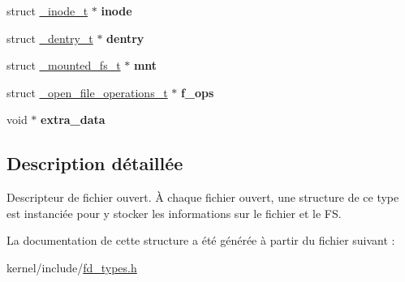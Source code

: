 \begin{DoxyCompactItemize}
\item 
\hypertarget{struct__open__file__descriptor_a6884ddeaeb43e81a0317cb5eae4c7d4e}{struct \hyperlink{struct__inode__t}{\-\_\-inode\-\_\-t} $\ast$ {\bfseries inode}}\label{struct__open__file__descriptor_a6884ddeaeb43e81a0317cb5eae4c7d4e}

\item 
\hypertarget{struct__open__file__descriptor_a3b375ad15f7bcb8e92123bd1a17765f3}{struct \hyperlink{struct__dentry__t}{\-\_\-dentry\-\_\-t} $\ast$ {\bfseries dentry}}\label{struct__open__file__descriptor_a3b375ad15f7bcb8e92123bd1a17765f3}

\item 
\hypertarget{struct__open__file__descriptor_a65408e330b7a3763de5549c826564730}{struct \hyperlink{struct__mounted__fs__t}{\-\_\-mounted\-\_\-fs\-\_\-t} $\ast$ {\bfseries mnt}}\label{struct__open__file__descriptor_a65408e330b7a3763de5549c826564730}

\item 
\hypertarget{struct__open__file__descriptor_a6cd707cf9a5d837feba5ef2a2f91bfcd}{struct \hyperlink{struct__open__file__operations__t}{\-\_\-open\-\_\-file\-\_\-operations\-\_\-t} $\ast$ {\bfseries f\-\_\-ops}}\label{struct__open__file__descriptor_a6cd707cf9a5d837feba5ef2a2f91bfcd}

\item 
\hypertarget{struct__open__file__descriptor_a99824795a31a8adea2162aed74162017}{void $\ast$ {\bfseries extra\-\_\-data}}\label{struct__open__file__descriptor_a99824795a31a8adea2162aed74162017}

\end{DoxyCompactItemize}


\subsection{Description détaillée}
Descripteur de fichier ouvert. À chaque fichier ouvert, une structure de ce type est instanciée pour y stocker les informations sur le fichier et le F\-S. 

La documentation de cette structure a été générée à partir du fichier suivant \-:\begin{DoxyCompactItemize}
\item 
kernel/include/\hyperlink{fd__types_8h}{fd\-\_\-types.\-h}\end{DoxyCompactItemize}
